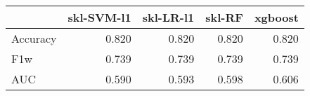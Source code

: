 \begin{tabular}{lrrrr}
\toprule
{} &  skl-SVM-l1 &  skl-LR-l1 &  skl-RF &  xgboost \\
\midrule
Accuracy &       0.820 &      0.820 &   0.820 &    0.820 \\
F1w      &       0.739 &      0.739 &   0.739 &    0.739 \\
AUC      &       0.590 &      0.593 &   0.598 &    0.606 \\
\bottomrule
\end{tabular}
